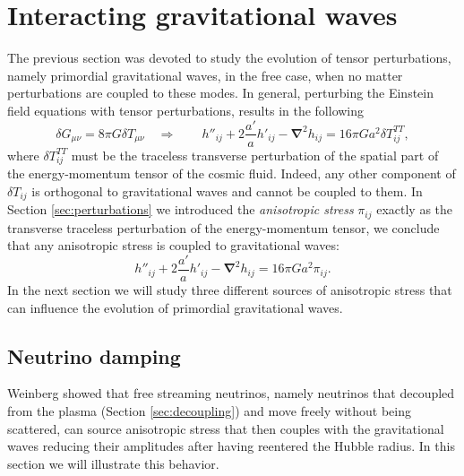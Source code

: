 \section{Interacting gravitational waves}
The previous section was devoted to study the evolution of tensor perturbations, namely primordial gravitational waves, in the free case, when no matter perturbations are coupled to these modes.
In general, perturbing the Einstein field equations with tensor perturbations, results in the following
$$\delta G_{\mu\nu}=8\pi G\delta T_{\mu\nu}\quad \Rightarrow\qquad h''_{ij}+2\frac{a'}{a}h'_{ij}-\boldsymbol{\nabla}^2 h_{ij}=16\pi G a^2\delta T_{ij}^{TT},$$
where $\delta T_{ij}^{TT}$ must be the traceless transverse perturbation of the spatial part of the energy-momentum tensor of the cosmic fluid. Indeed, any other component of $\delta T_{ij}$ is orthogonal to gravitational waves and cannot be coupled to them. In Section \ref{sec:perturbations} we introduced the \emph{anisotropic stress} $\pi_{ij}$ exactly as the transverse traceless perturbation of the energy-momentum tensor, we conclude that any anisotropic stress is coupled to gravitational waves:
\begin{equation}
    h''_{ij}+2\frac{a'}{a}h'_{ij}-\boldsymbol{\nabla}^2 h_{ij}=16\pi G a^2\pi_{ij}.\label{eq:GW_EOM_stress}
\end{equation}
In the next section we will study three different sources of anisotropic stress that can influence the evolution of primordial gravitational waves.
\subsection{Neutrino damping}
\label{sec:neutrino_damping}
 Weinberg \cite{Weinberg_nu_dump} showed that free streaming neutrinos, namely neutrinos that decoupled from the plasma (Section \ref{sec:decoupling}) and move freely without being scattered, can source anisotropic stress that then couples with the gravitational waves reducing their amplitudes after having reentered the Hubble radius. In this section we will illustrate this behavior.

